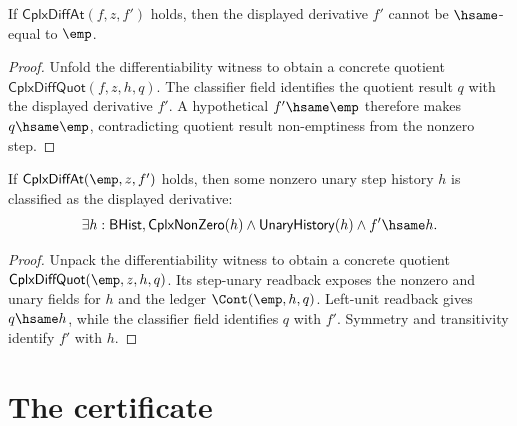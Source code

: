 \begin{theorem}
\label{thm:derivative-cplx-diff-at-derivative-nonempty}
If \(\mathsf{CplxDiffAt}(f,z,f')\) holds, then the displayed derivative
\(f'\) cannot be $\hsame$-equal to \(\emp\).
\end{theorem}
\begin{proof}
Unfold the differentiability witness to obtain a concrete quotient
\(\mathsf{CplxDiffQuot}(f,z,h,q)\). The classifier field identifies the
quotient result \(q\) with the displayed derivative \(f'\). A hypothetical
\(f'\hsame\emp\) therefore makes \(q\hsame\emp\), contradicting quotient
result non-emptiness from the nonzero step.
\end{proof}

\begin{theorem}
\label{thm:derivative-cplxdiffat-empty-function-step-readback}
If $\mathsf{CplxDiffAt}(\emp,z,f')$ holds, then some nonzero unary step
history $h$ is classified as the displayed derivative:
$$
\exists h:\mathsf{BHist},
\mathsf{CplxNonZero}(h)\land \mathsf{UnaryHistory}(h)\land f'\hsame h.
$$
\end{theorem}
\begin{proof}
Unpack the differentiability witness to obtain a concrete quotient
$\mathsf{CplxDiffQuot}(\emp,z,h,q)$. Its step-unary readback exposes the
nonzero and unary fields for $h$ and the ledger $\Cont(\emp,h,q)$. Left-unit
readback gives $q\hsame h$, while the classifier field identifies $q$ with
$f'$. Symmetry and transitivity identify $f'$ with $h$.
\end{proof}

\section{The certificate}
\label{sec:derivative-certificate}

